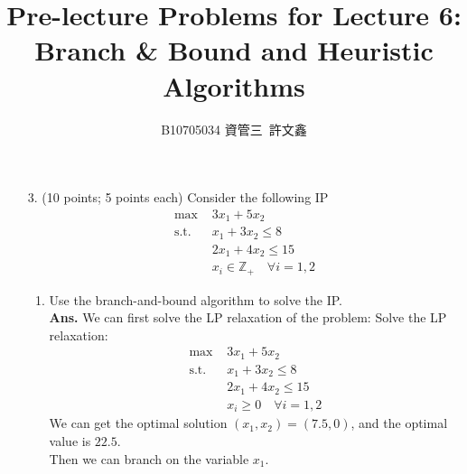 \documentclass[12pt]{article}
\title{Pre-lecture Problems for Lecture 6:\\ Branch \& Bound and Heuristic Algorithms}
\author{B10705034 資管三\ 許文鑫}
\begin{document}
\maketitle
\begin{enumerate}
      \item [3.] (10 points; 5 points each) Consider the following IP
            \begin{align*}
                  \text{max }  & 3x_1 + 5x_2                                 \\
                  \text{s.t. } & x_1 + 3x_2 \leq 8                           \\
                               & 2x_1 + 4x_2 \leq 15                         \\
                               & x_i \in \mathbb{Z}_+ \quad \forall i = 1, 2
            \end{align*}
            \begin{enumerate}
                  \item Use the branch-and-bound algorithm to solve the IP.\\
                        \textbf{Ans. }
                        We can first solve the LP relaxation of the problem:
                        Solve the LP relaxation:
                        \begin{align*}
                              \text{max }  & 3x_1 + 5x_2                       \\
                              \text{s.t. } & x_1 + 3x_2 \leq 8                 \\
                                           & 2x_1 + 4x_2 \leq 15               \\
                                           & x_i \geq 0 \quad \forall i = 1, 2
                        \end{align*}
                        We can get the optimal solution $(x_1, x_2) = (7.5, 0)$, and the optimal value is $22.5$.\\
                        Then we can branch on the variable $x_1$.
                        \begin{figure}[H]
                              \centering

\end{figure}
\end{enumerate}
\end{enumerate}
\end{document}
